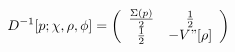 \begin{equation}
  D^{-1}[p;\chi,\rho,\phi] =
\left( \begin{array}{cc}
 \frac{\Sigma(p)}{2} & \frac{1}{2} \\
\frac{1}{2} & -V"[\rho]
\end{array}
\right)
\end{equation}

